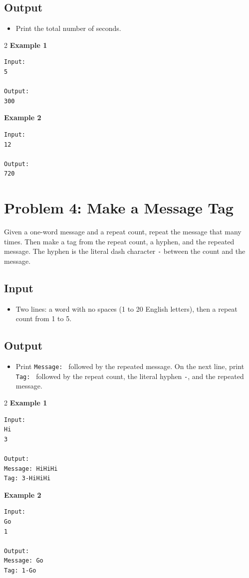 \documentclass[12pt,oneside,openany]{article}
\begin{document}
\subsection*{Output}
\begin{itemize}
    \item Print the total number of seconds.
\end{itemize}
\vspace{0.2cm}

\begin{example*}{}{}
\begin{multicols}{2}
\textbf{Example 1}
\begin{verbatim}
Input:
5

Output:
300
\end{verbatim}
\textbf{Example 2}
\begin{verbatim}
Input:
12

Output:
720
\end{verbatim}
\end{multicols}
\end{example*}
\newpage
\section*{Problem 4: Make a Message Tag}

Given a one-word message and a repeat count, repeat the message that many times. Then make a tag from the repeat count, a hyphen, and the repeated message. The hyphen is the literal dash character \texttt{-} between the count and the message.

\subsection*{Input}
\begin{itemize}
    \item Two lines: a word with no spaces (1 to 20 English letters), then a repeat count from 1 to 5.
\end{itemize}

\subsection*{Output}
\begin{itemize}
    \item Print \texttt{Message: } followed by the repeated message. On the next line, print \texttt{Tag: } followed by the repeat count, the literal hyphen \texttt{-}, and the repeated message.
\end{itemize}
\vspace{0.2cm}

\begin{example*}{}{}
\begin{multicols}{2}
\textbf{Example 1}
\begin{verbatim}
Input:
Hi
3

Output:
Message: HiHiHi
Tag: 3-HiHiHi
\end{verbatim}
\textbf{Example 2}
\begin{verbatim}
Input:
Go
1

Output:
Message: Go
Tag: 1-Go
\end{verbatim}
\end{multicols}
\end{example*}
\end{document}
